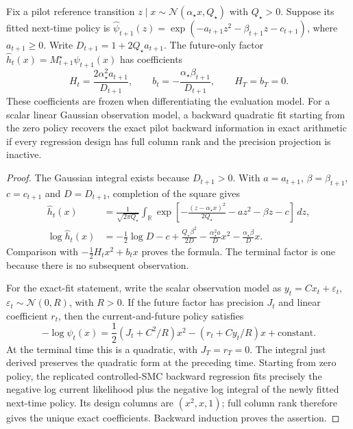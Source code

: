 \begin{proposition}
\label{prop:bg-fitted-future}
Fix a pilot reference transition
$z\mid x\sim\mathcal N(\alpha_\star x,Q_\star)$ with $Q_\star>0$.
Suppose its fitted next-time policy is
$\widehat\psi_{t+1}(z)=\exp(-a_{t+1}z^2-\beta_{t+1}z-c_{t+1})$,
where $a_{t+1}\geq0$. Write
$D_{t+1}=1+2Q_\star a_{t+1}$. The future-only factor
$\widehat h_t(x)=M^\star_{t+1}\widehat\psi_{t+1}(x)$ has coefficients
\begin{equation}
 H_t=\frac{2\alpha_\star^2 a_{t+1}}{D_{t+1}},
 \qquad b_t=-\frac{\alpha_\star\beta_{t+1}}{D_{t+1}},
 \qquad H_T=b_T=0.                                      \label{eq:bg-fitted-future}
\end{equation}
These coefficients are frozen when differentiating the evaluation model.
For a scalar linear Gaussian observation model, a backward quadratic fit
starting from the zero policy recovers the exact pilot backward information
in exact arithmetic if every regression design has full column rank and
the precision projection is inactive.
\end{proposition}
\begin{proof}
The Gaussian integral exists because $D_{t+1}>0$. With
$a=a_{t+1}$, $\beta=\beta_{t+1}$, $c=c_{t+1}$ and $D=D_{t+1}$,
completion of the square gives
\begin{align*}
 \widehat h_t(x)
 &=\frac{1}{\sqrt{2\pi Q_\star}}
   \int_{\mathbb R}
   \exp\!\left[-\frac{(z-\alpha_\star x)^2}{2Q_\star}
                   -az^2-\beta z-c\right]\,dz,\\
 \log\widehat h_t(x)
 &=-\frac12\log D-c+\frac{Q_\star\beta^2}{2D}
   -\frac{\alpha_\star^2a}{D}x^2
   -\frac{\alpha_\star\beta}{D}x .
\end{align*}
Comparison with $-\tfrac12 H_t x^2+b_t x$ proves the formula.
The terminal factor is one because there is no subsequent observation.

For the exact-fit statement, write the scalar observation model as
$y_t=Cx_t+\varepsilon_t$, $\varepsilon_t\sim\mathcal N(0,R)$,
with $R>0$. If the future factor has precision $J_t$ and linear
coefficient $r_t$, then the current-and-future policy satisfies
\[
 -\log\psi_t(x)
 =\frac12(J_t+C^2/R)x^2-(r_t+Cy_t/R)x+\text{constant}.
\]
At the terminal time this is a quadratic, with $J_T=r_T=0$.
The integral just derived preserves the quadratic form at the preceding
time. Starting from zero policy, the replicated controlled-SMC backward
regression fits precisely the negative log current likelihood plus the
negative log integral of the newly fitted next-time policy. Its design
columns are $(x^2,x,1)$; full column rank therefore gives the unique exact
coefficients. Backward induction proves the assertion.
\end{proof}

